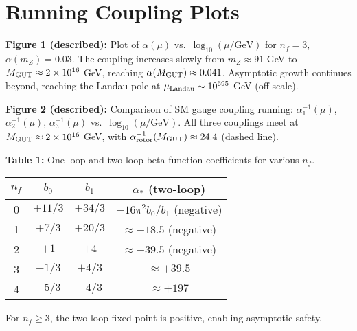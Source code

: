 \documentclass[11pt,a4paper]{article}
\numberwithin{equation}{section}
\theoremstyle{plain}
\theoremstyle{definition}
\theoremstyle{remark}
\begin{document}
\section{Running Coupling Plots}\label{app:plots}

\textbf{Figure 1 (described):} Plot of $\alpha(\mu)$ vs.\ $\log_{10}(\mu/\text{GeV})$ for $n_f=3$, $\alpha(m_Z)=0.03$. The coupling increases slowly from $m_Z\approx 91$ GeV to $M_{\rm GUT}\approx 2\times 10^{16}$ GeV, reaching $\alpha(M_{\rm GUT})\approx 0.041$. Asymptotic growth continues beyond, reaching the Landau pole at $\mu_{\rm Landau}\sim 10^{695}$ GeV (off-scale).

\textbf{Figure 2 (described):} Comparison of SM gauge coupling running: $\alpha_1^{-1}(\mu)$, $\alpha_2^{-1}(\mu)$, $\alpha_3^{-1}(\mu)$ vs.\ $\log_{10}(\mu/\text{GeV})$. All three couplings meet at $M_{\rm GUT}\approx 2\times 10^{16}$ GeV, with $\alpha_{\rm rotor}^{-1}(M_{\rm GUT})\approx 24.4$ (dashed line).

\textbf{Table 1:} One-loop and two-loop beta function coefficients for various $n_f$.

\begin{center}
\begin{tabular}{cccc}
\toprule
$n_f$ & $b_0$ & $b_1$ & $\alpha_*$ (two-loop) \\
\midrule
0 & $+11/3$ & $+34/3$ & $-16\pi^2 b_0/b_1$ (negative) \\
1 & $+7/3$ & $+20/3$ & $\approx -18.5$ (negative) \\
2 & $+1$ & $+4$ & $\approx -39.5$ (negative) \\
3 & $-1/3$ & $+4/3$ & $\approx +39.5$ \\
4 & $-5/3$ & $-4/3$ & $\approx +197$ \\
\bottomrule
\end{tabular}
\end{center}

For $n_f\geq 3$, the two-loop fixed point is positive, enabling asymptotic safety.
\end{document}
